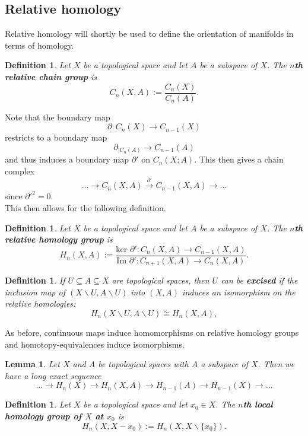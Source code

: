 \documentclass{article}
\newtheorem{definition}[theorem]{Definition}
\newtheorem{lemma}[theorem]{Lemma}
\begin{document}
\subsection{Relative homology}
Relative homology will shortly be used to define the orientation of manifolds in terms of homology.
\begin{definition}
Let $X$ be a topological space and let $A$ be a subspace of $X$. The \textbf{$n$th relative chain group} is \[C_n(X,A):=\frac{C_n(X)}{C_n(A)}.\]
\end{definition}

\noindent Note that the boundary map \[\partial:C_n(X)\to C_{n-1}(X)\] restricts to a boundary map \[\partial_{|C_n(A)}\to C_{n-1}(A)\] and thus induces a boundary map $\partial'$ on $C_n(X;A)$.
This then gives a chain complex \[...\to C_n(X,A)\overset{\partial'}{\to}C_{n-1}(X,A)\to...\] since $\partial'^2=0$.\\

\noindent This then allows for the following definition.

\begin{definition}
Let $X$ be a topological space and let $A$ be a subspace of $X$. The \textbf{$n$th relative homology group} is \[H_n(X,A):=\frac{\text{ker }\partial':C_n(X,A)\to C_{n-1}(X,A)}{\text{Im }\partial':C_{n+1}(X,A)\to C_n(X,A)}.\]
\end{definition}

\begin{definition}
If $U\subseteq A\subseteq X$ are topological spaces, then $U$ can be \textbf{excised} if the inclusion map of $(X\backslash U,A\backslash U)$ into $(X,A)$ induces an isomorphism on the relative homologies:\[H_n(X\backslash U,A\backslash U)\cong H_n(X,A),\]
\end{definition}

\noindent As before, continuous maps induce homomorphisms on relative homology groups and homotopy-equivalences induce isomorphisms.

\begin{lemma}
Let $X$ and $A$ be topological spaces with $A$ a subspace of $X$. Then we have a long exact sequence \[...\to H_n(X)\to H_n(X,A)\to H_{n-1}(A)\to H_{n-1}(X)\to...\]
\end{lemma}

\begin{definition}
Let $X$ be a topological space and let $x_0\in X$. The \textbf{$n$th local homology group of $X$ at $x_0$} is \[H_n(X,X-x_0):=H_n(X,X\backslash\{x_0\}).\]
\end{definition}
\end{document}

